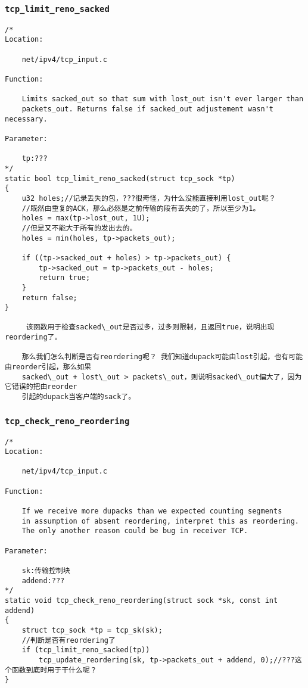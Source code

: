         \subsubsection{\texttt{tcp_limit_reno_sacked}}
\begin{verbatim}
/* 
Location:

    net/ipv4/tcp_input.c

Function:

    Limits sacked_out so that sum with lost_out isn't ever larger than
    packets_out. Returns false if sacked_out adjustement wasn't necessary.

Parameter:

    tp:???
*/
static bool tcp_limit_reno_sacked(struct tcp_sock *tp)
{
    u32 holes;//记录丢失的包，???很奇怪，为什么没能直接利用lost_out呢？
    //既然由重复的ACK，那么必然是之前传输的段有丢失的了，所以至少为1。
    holes = max(tp->lost_out, 1U);
    //但是又不能大于所有的发出去的。
    holes = min(holes, tp->packets_out);

    if ((tp->sacked_out + holes) > tp->packets_out) {
        tp->sacked_out = tp->packets_out - holes;
        return true;
    }
    return false;
}

     该函数用于检查sacked\_out是否过多，过多则限制，且返回true，说明出现reordering了。

    那么我们怎么判断是否有reordering呢？ 我们知道dupack可能由lost引起，也有可能由reorder引起，那么如果 
    sacked\_out + lost\_out > packets\_out，则说明sacked\_out偏大了，因为它错误的把由reorder 
    引起的dupack当客户端的sack了。
\end{verbatim}
        \subsubsection{\texttt{tcp_check_reno_reordering}}
\begin{verbatim}
/* 
Location:
    
    net/ipv4/tcp_input.c

Function:

    If we receive more dupacks than we expected counting segments
    in assumption of absent reordering, interpret this as reordering.
    The only another reason could be bug in receiver TCP.

Parameter:

    sk:传输控制块
    addend:???
*/
static void tcp_check_reno_reordering(struct sock *sk, const int addend)
{
    struct tcp_sock *tp = tcp_sk(sk);
    //判断是否有reordering了
    if (tcp_limit_reno_sacked(tp))
        tcp_update_reordering(sk, tp->packets_out + addend, 0);//???这个函数到底时用于干什么呢？
}
\end{verbatim}
